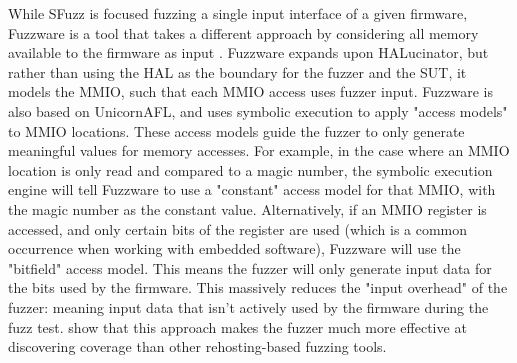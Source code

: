 \documentclass[../report.tex]{subfiles}
\begin{document}
While SFuzz is focused fuzzing a single input interface of a given firmware,
Fuzzware is a tool that takes a different approach by considering all memory
available to the firmware as input \citep{Fuzzware_2022}. Fuzzware expands upon
HALucinator, but rather than using the HAL as the boundary for the fuzzer and
the SUT, it models the MMIO, such that each MMIO access uses fuzzer input.
Fuzzware is also based on UnicornAFL, and uses symbolic execution to apply
"access models" to MMIO locations. These access models guide the fuzzer to only
generate meaningful values for memory accesses. For example, in the case where
an MMIO location is only read and compared to a magic number, the symbolic
execution engine will tell Fuzzware to use a "constant" access model for that
MMIO, with the magic number as the constant value. Alternatively, if an MMIO
register is accessed, and only certain bits of the register are used (which is
a common occurrence when working with embedded software), Fuzzware will use the
"bitfield" access model. This means the fuzzer will only generate input data
for the bits used by the firmware. This massively reduces the "input overhead"
of the fuzzer: meaning input data that isn't actively used by the firmware
during the fuzz test. \citet{Fuzzware_2022} show that this approach makes the
fuzzer much more effective at discovering coverage than other rehosting-based
fuzzing tools.
\end{document}
